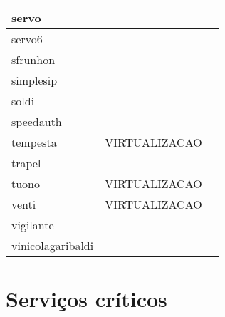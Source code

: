 \begin{table}
\begin{center}
\begin{tabular}[]{|l|l|l|}
servo &  & \\\hline
servo6 &  & \\\hline
sfrunhon &  & \\\hline
simplesip &  & \\\hline
soldi &  & \\\hline
speedauth &  & \\\hline
tempesta & VIRTUALIZACAO & \\\hline
trapel &  & \\\hline
tuono & VIRTUALIZACAO & \\\hline
venti & VIRTUALIZACAO & \\\hline
vigilante &  & \\\hline
vinicolagaribaldi &  & \\\hline
\end{tabular}
\end{center}
\end{table}


\section{Serviços críticos}
\label{section:servcrit}


